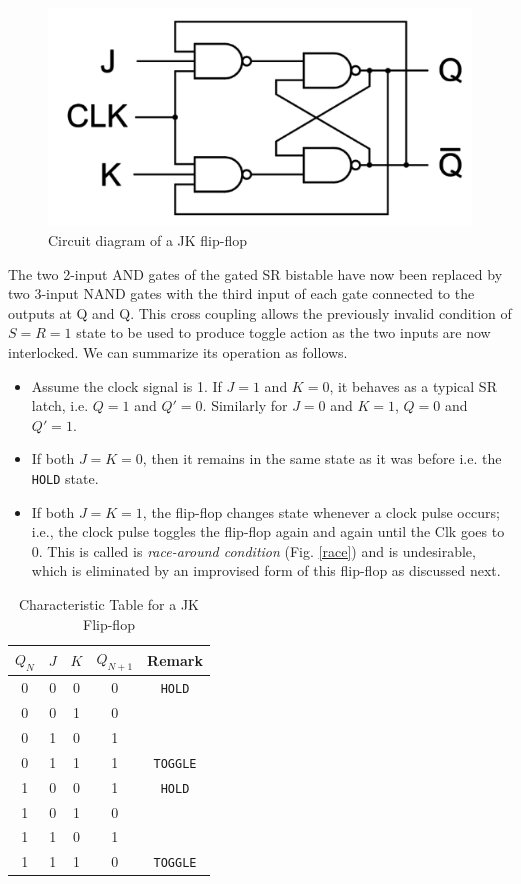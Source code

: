 \begin{figure}[H]
    \centering
    \includegraphics[width=0.70\columnwidth]{images/jk.png}
    \caption{Circuit diagram of a JK flip-flop}
    \label{4}
\end{figure}

The two 2-input AND gates of the gated SR bistable have now been replaced by two 3-input NAND gates with the third input of each gate connected to the outputs at Q and Q. This cross coupling allows the previously invalid condition of $S=R=1$ state to be used to produce toggle action as the two inputs are now interlocked. We can summarize its operation as follows.

\begin{itemize}
    \item Assume the clock signal is 1. If $J=1$ and $K=0$, it behaves as a typical SR latch, i.e. $Q=1$ and $Q'=0$. Similarly for $J=0$ and $K=1$, $Q=0$ and $Q'=1$.
    \item If both $J=K=0$, then it remains in the same state as it was before i.e. the \verb|HOLD| state.
    \item If both $J=K=1$, the flip-flop changes state whenever a clock
    pulse occurs; i.e., the clock pulse toggles the flip-flop again and again until the Clk goes to 0. This is called is \textit{race-around condition} (Fig. \ref{race}) and is undesirable, which is eliminated by an improvised form of this flip-flop as discussed next.
\end{itemize}

\begin{table}[H]
    \centering
    \begin{tabular}{|c|c|c|c|c|}\hline
        $Q_N$ & $J$ & $K$ & $Q_{N+1}$ & Remark \\ \hline
        0 & 0 & 0 & 0 & \verb|HOLD| \\ 
        0 & 0 & 1 & 0 & \\ 
        0 & 1 & 0 & 1 &\\ 
        0 & 1 & 1 & 1 & \verb|TOGGLE| \\ 
        1 & 0 & 0 & 1 & \verb|HOLD|\\ 
        1 & 0 & 1 & 0 &\\ 
        1 & 1 & 0 & 1 &\\
        1 & 1 & 1 & 0 & \verb|TOGGLE| \\ \hline
    \end{tabular}
    \caption{Characteristic Table for a JK Flip-flop}
\end{table}

